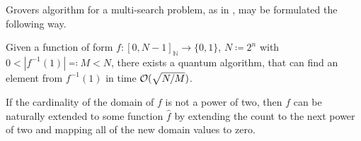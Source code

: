 Grovers algorithm for a multi-search problem, as in \cite[pp. 140-155]{Homeister2018}, may be formulated the following way.

\begin{theorem} \label{grovers_algorithm_for_a_multi_search_problem}
    Given a function of form \(f\colon [0, N-1]_{\mathbb{N}} \to \{0, 1\}\), \(N \coloneqq 2^n\) with \(0 < |f^{-1}(1)| \eqqcolon M < N\), there exists a quantum algorithm, that can find an element from \(f^{-1}(1)\) in time \(\operatorname{\mathcal{O}}(\sqrt{N/M})\).
\end{theorem}

\begin{remark}[Form of \(f\)]
    If the cardinality of the domain of \(f\) is not a power of two, then \(f\) can be naturally extended to some function \(\hat{f}\) by extending the count to the next power of two and mapping all of the new domain values to zero.
\end{remark}


